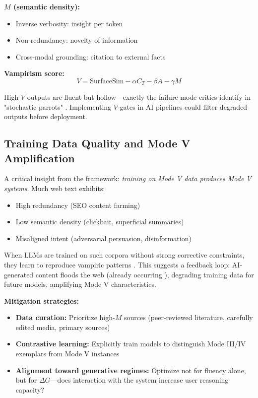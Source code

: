 \documentclass[12pt]{article}
\begin{document}
\textbf{$M$ (semantic density):}
\begin{itemize}
\item Inverse verbosity: insight per token
\item Non-redundancy: novelty of information
\item Cross-modal grounding: citation to external facts
\end{itemize}

\textbf{Vampirism score:}
\[
V = \text{SurfaceSim} - \alpha C_T - \beta A - \gamma M
\]

High $V$ outputs are fluent but hollow—exactly the failure mode critics identify in "stochastic parrots" \citep{bender2020climbing}. Implementing $V$-gates in AI pipelines could filter degraded outputs before deployment.

\subsection{Training Data Quality and Mode V Amplification}

A critical insight from the framework: \textit{training on Mode V data produces Mode V systems}. Much web text exhibits:
\begin{itemize}
\item High redundancy (SEO content farming)
\item Low semantic density (clickbait, superficial summaries)
\item Misaligned intent (adversarial persuasion, disinformation)
\end{itemize}

When LLMs are trained on such corpora without strong corrective constraints, they learn to reproduce vampiric patterns \citep{bender2021dangers}. This suggests a feedback loop: AI-generated content floods the web (already occurring \citep{goldstein2023generative}), degrading training data for future models, amplifying Mode V characteristics.

\textbf{Mitigation strategies:}
\begin{itemize}
\item \textbf{Data curation:} Prioritize high-$M$ sources (peer-reviewed literature, carefully edited media, primary sources)
\item \textbf{Contrastive learning:} Explicitly train models to distinguish Mode III/IV exemplars from Mode V instances
\item \textbf{Alignment toward generative regimes:} Optimize not for fluency alone, but for $\Delta G$—does interaction with the system increase user reasoning capacity?
\end{itemize}
\end{document}
